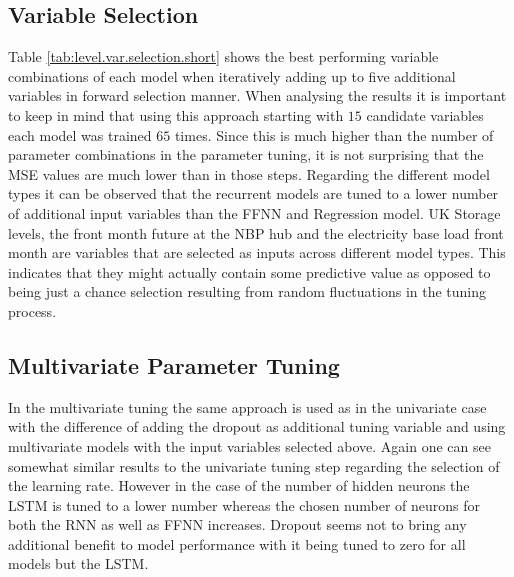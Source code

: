 \subsection{Variable Selection}
Table \ref{tab:level.var.selection.short} shows the best performing variable combinations of each model when iteratively adding up to five additional variables in forward selection manner. When analysing the results it is important to keep in mind that using this approach starting with $15$ candidate variables each model was trained $65$ times. Since this is much higher than the number of parameter combinations in the parameter tuning, it is not surprising that the MSE values are much lower than in those steps. Regarding the different model types it can be observed that the recurrent models are tuned to a lower number of additional input variables than the FFNN and Regression model. UK Storage levels, the front month future at the NBP hub and the electricity base load front month are variables that are selected as inputs across different model types. This indicates that they might actually contain some predictive value as opposed to being just a chance selection resulting from random fluctuations in the tuning process.

\subsection{Multivariate Parameter Tuning}
In the multivariate tuning the same approach is used as in the univariate case with the difference of adding the dropout as additional tuning variable and using multivariate models with the input variables selected above. Again one can see somewhat similar results to the univariate tuning step regarding the selection of the  learning rate. However in the case of the number of hidden neurons the LSTM is tuned to a lower number whereas the chosen number of neurons for both the RNN as well as FFNN increases. Dropout seems not to bring any additional benefit to model performance with it being tuned to zero for all models but the LSTM.

